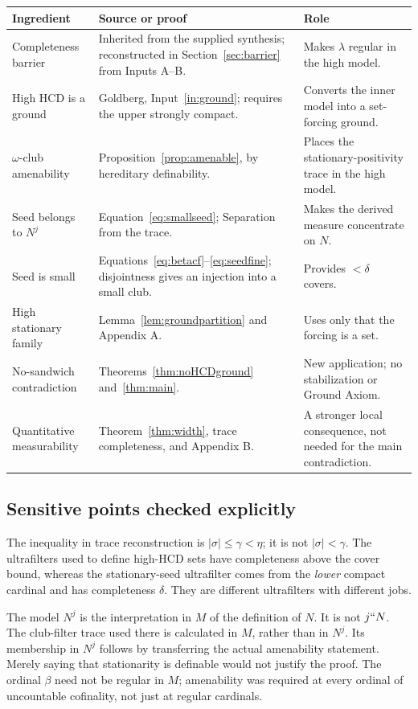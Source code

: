 \documentclass[11pt,letterpaper]{article}
\theoremstyle{definition}
\numberwithin{equation}{section}
\newcommand{\HCD}{\mathrm{HCD}}
\begin{document}
\begin{center}
\small
\renewcommand{\arraystretch}{1.22}
\begin{tabularx}{\textwidth}{@{}P{.26\textwidth}YY@{}}
\toprule
\textbf{Ingredient}&\textbf{Source or proof}&\textbf{Role}\nobreak\\\midrule
Completeness barrier&Inherited from the supplied synthesis; reconstructed in Section~\ref{sec:barrier} from Inputs A--B.&Makes $\lambda$ regular in the high model.\\
High $\HCD$ is a ground&Goldberg, Input~\ref{in:ground}; requires the upper strongly compact.&Converts the inner model into a set-forcing ground.\\
$\omega$-club amenability&Proposition~\ref{prop:amenable}, by hereditary definability.&Places the stationary-positivity trace in the high model.\\
Seed belongs to $N^j$&Equation~\eqref{eq:smallseed}; Separation from the trace.&Makes the derived measure concentrate on $N$.\\
Seed is small&Equations~\eqref{eq:betacf}--\eqref{eq:seedfine}; disjointness gives an injection into a small club.&Provides $<\delta$ covers.\\
High stationary family&Lemma~\ref{lem:groundpartition} and Appendix A.&Uses only that the forcing is a set.\\
No-sandwich contradiction&Theorems~\ref{thm:noHCDground} and~\ref{thm:main}.&New application; no stabilization or Ground Axiom.\\
Quantitative measurability&Theorem~\ref{thm:width}, trace completeness, and Appendix B.&A stronger local consequence, not needed for the main contradiction.\\
\bottomrule
\end{tabularx}
\end{center}

\subsection{Sensitive points checked explicitly}

The inequality in trace reconstruction is
$|\sigma|\le\gamma<\eta$; it is not $|\sigma|<\gamma$.
The ultrafilters used to define high-$\HCD$ sets have completeness
above the cover bound, whereas the stationary-seed ultrafilter comes
from the \emph{lower} compact cardinal and has completeness
$\delta$. They are different ultrafilters with different jobs.

The model $N^j$ is the interpretation in $M$ of the definition of $N$.
It is not $j``N$. The club-filter trace used there is calculated in
$M$, rather than in $N^j$. Its membership in $N^j$ follows by
transferring the actual amenability statement. Merely saying that
stationarity is definable would not justify the proof. The ordinal
$\beta$ need not be regular in $M$; amenability was required at every
ordinal of uncountable cofinality, not just at regular cardinals.
\end{document}
